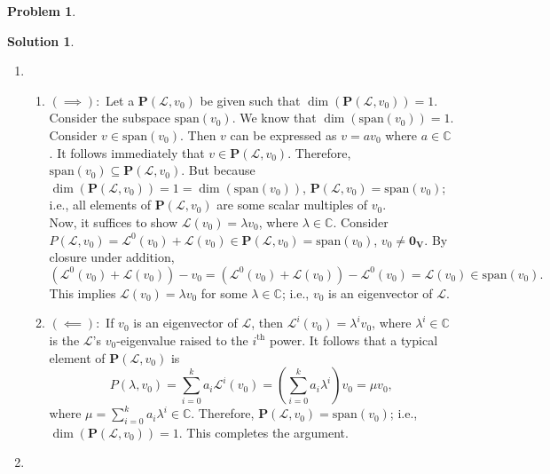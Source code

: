 \documentclass{book}
\theoremstyle{definition}
\newtheorem*{prob*}{Problem}
\newtheorem*{sln*}{Solution}
\newcommand{\V}{\mathbf{V}}
\newcommand{\xpan}{\text{span}}
\newcommand{\lag}{\mathcal{L}}
\begin{document}
\begin{prob*}
\begin{sln*}
\begin{enumerate}
			
			
			\item 
			\begin{enumerate}

			\item $(\implies):$ Let a $\mathbf{P}(\lag,v_0)$ be given such that $\dim(\mathbf{P}(\lag,v_0)) = 1$. Consider the subspace $\xpan(v_0)$. We know that $\dim(\xpan(v_0)) = 1$. Consider $v \in \xpan(v_0)$. Then $v$ can be expressed as $v = av_0$ where $a\in \mathbb{C}$. It follows immediately that $v\in \mathbf{P}(\lag,v_0)$. Therefore, $\xpan(v_0) \subseteq \mathbf{P}(\lag,v_0)$. But because $\dim(\mathbf{P}(\lag,v_0)) = 1 = \dim(\xpan(v_0))$, $\mathbf{P}(\lag,v_0) = \xpan(v_0)$; i.e., all elements of $\mathbf{P}(\lag,v_0)$ are some scalar multiples of $v_0$.\\
			
			Now, it suffices to show $\lag(v_0) = \lambda v_0$, where $\lambda \in \mathbb{C}$. Consider $P(\lag, v_0) = \lag^0(v_0) + \lag(v_0) \in \mathbf{P}(\lag,v_0) = \xpan(v_0)$, $v_0 \neq \mathbf{0}_\V$. By closure under addition, $$(\lag^0(v_0) + \lag(v_0)) - v_0 = (\lag^0(v_0) + \lag(v_0)) - \lag^0(v_0) = \lag(v_0) \in \xpan(v_0).$$ This implies $\lag(v_0) = \lambda v_0$ for some $\lambda \in \mathbb{C}$; i.e., $v_0$ is an eigenvector of $\lag$.\\
				
				
			\item $(\impliedby):$ If $v_0$ is an eigenvector of $\lag$, then $\lag^i(v_0) = \lambda^i v_0$, where $\lambda^i \in \mathbb{C}$ is the $\lag$'s $v_0$-eigenvalue raised to the $i^{\text{th}}$ power. It follows that a typical element of $\mathbf{P}(\lag,v_0)$ is $$P(\lambda,v_0) = \sum_{i=0}^k a_i \lag^i (v_0) =  \left(\sum_{i=0}^k a_i\lambda^i\right)  v_0 = \mu v_0,$$
			where $\mu = \sum_{i=0}^k a_i \lambda^i \in \mathbb{C}$. Therefore, $\mathbf{P}(\lag,v_0) = \xpan(v_0)$; i.e., $\dim\left(\mathbf{P}(\lag,v_0)\right) = 1$. This completes the argument. \\
			
			\end{enumerate}
		
		\item
		\begin{enumerate}
			

\end{enumerate}
\end{enumerate}
\end{sln*}
\end{prob*}
\end{document}
